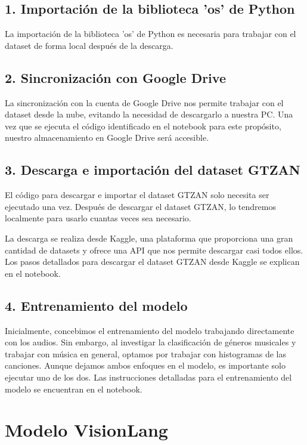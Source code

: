 \documentclass[colorinlistoftodos,twoside,twocolumn,10pt]{article} %
\begin{document}
\subsection*{1. Importaci\'on de la biblioteca 'os' de Python}

La importaci\'on de la biblioteca 'os' de Python es necesaria para trabajar con el dataset de forma local despu\'es de la descarga.

\subsection*{2. Sincronizaci\'on con Google Drive}

La sincronizaci\'on con la cuenta de Google Drive nos permite trabajar con el dataset desde la nube, evitando la necesidad de descargarlo a nuestra PC. Una vez que se ejecuta el c\'odigo identificado en el notebook para este prop\'osito, nuestro almacenamiento en Google Drive ser\'a accesible.

\subsection*{3. Descarga e importaci\'on del dataset GTZAN}

El c\'odigo para descargar e importar el dataset GTZAN solo necesita ser ejecutado una vez. Despu\'es de descargar el dataset GTZAN, lo tendremos localmente para usarlo cuantas veces sea necesario.

La descarga se realiza desde Kaggle, una plataforma que proporciona una gran cantidad de datasets y ofrece una API que nos permite descargar casi todos ellos. Los pasos detallados para descargar el dataset GTZAN desde Kaggle se explican en el notebook.

\subsection*{4. Entrenamiento del modelo}

Inicialmente, concebimos el entrenamiento del modelo trabajando directamente con los audios. Sin embargo, al investigar la clasificaci\'on de g\'eneros musicales y trabajar con m\'usica en general, optamos por trabajar con histogramas de las canciones. Aunque dejamos ambos enfoques en el modelo, es importante solo ejecutar uno de los dos. Las instrucciones detalladas para el entrenamiento del modelo se encuentran en el notebook.

\section{Modelo VisionLang}
\end{document}

